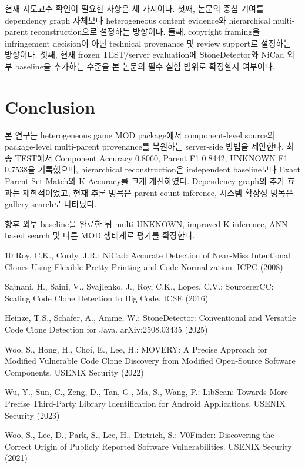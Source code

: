 \documentclass[runningheads]{llncs}
\begin{document}
현재 지도교수 확인이 필요한 사항은 세 가지이다.
첫째, 논문의 중심 기여를 dependency graph 자체보다 heterogeneous content
evidence와 hierarchical multi-parent reconstruction으로 설정하는 방향이다.
둘째, copyright framing을 infringement decision이 아닌 technical provenance
및 review support로 설정하는 방향이다.
셋째, 현재 frozen TEST/server evaluation에 StoneDetector와 NiCad 외부
baseline을 추가하는 수준을 본 논문의 필수 실험 범위로 확정할지 여부이다.

\section{Conclusion}

본 연구는 heterogeneous game MOD package에서 component-level source와
package-level multi-parent provenance를 복원하는 server-side 방법을 제안한다.
최종 TEST에서 Component Accuracy 0.8060, Parent F1 0.8442,
UNKNOWN F1 0.7538을 기록했으며, hierarchical reconstruction은 independent
baseline보다 Exact Parent-Set Match와 K Accuracy를 크게 개선하였다.
Dependency graph의 추가 효과는 제한적이었고, 현재 추론 병목은 parent-count
inference, 시스템 확장성 병목은 gallery search로 나타났다.

향후 외부 baseline을 완료한 뒤 multi-UNKNOWN, improved K inference,
ANN-based search 및 다른 MOD 생태계로 평가를 확장한다.

\begin{thebibliography}{10}
Roy, C.K., Cordy, J.R.: NiCad: Accurate Detection of Near-Miss Intentional
Clones Using Flexible Pretty-Printing and Code Normalization. ICPC (2008)

Sajnani, H., Saini, V., Svajlenko, J., Roy, C.K., Lopes, C.V.:
SourcererCC: Scaling Code Clone Detection to Big Code. ICSE (2016)

Heinze, T.S., Sch{\"a}fer, A., Amme, W.:
StoneDetector: Conventional and Versatile Code Clone Detection for Java.
arXiv:2508.03435 (2025)

Woo, S., Hong, H., Choi, E., Lee, H.:
MOVERY: A Precise Approach for Modified Vulnerable Code Clone Discovery
from Modified Open-Source Software Components. USENIX Security (2022)

Wu, Y., Sun, C., Zeng, D., Tan, G., Ma, S., Wang, P.:
LibScan: Towards More Precise Third-Party Library Identification for Android
Applications. USENIX Security (2023)

Woo, S., Lee, D., Park, S., Lee, H., Dietrich, S.:
V0Finder: Discovering the Correct Origin of Publicly Reported Software
Vulnerabilities. USENIX Security (2021)
\end{thebibliography}
\end{document}
